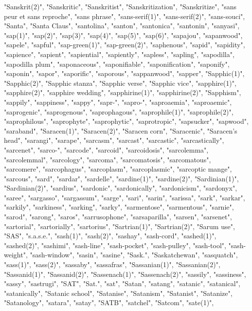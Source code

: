 "Sanskrit(2)",
"Sanskritic",
"Sanskritist",
"Sanskritization",
"Sanskritize",
"sans peur et sans reproche",
"sans phrase",
"sans-serif(1)",
"sans-serif(2)",
"sans-souci",
"Santa",
"Santa Claus",
"santolina",
"santon",
"santonica",
"santonin",
"sanyasi",
"sap(1)",
"sap(2)",
"sap(3)",
"sap(4)",
"sap(5)",
"sap(6)",
"sapajou",
"sapanwood",
"sapele",
"sapful",
"sap-green(1)",
"sap-green(2)",
"saphenous",
"sapid",
"sapidity",
"sapience",
"sapient",
"sapiential",
"sapiently",
"sapless",
"sapling",
"sapodilla",
"sapodilla plum",
"saponaceous",
"saponifiable",
"saponification",
"saponify",
"saponin",
"sapor",
"saporific",
"saporous",
"sappanwood",
"sapper",
"Sapphic(1)",
"Sapphic(2)",
"Sapphic stanza",
"Sapphic verse",
"Sapphic vice",
"sapphire(1)",
"sapphire(2)",
"sapphire wedding",
"sapphirine(1)",
"sapphirine(2)",
"Sapphism",
"sappily",
"sappiness",
"sappy",
"sapr-",
"sapro-",
"saproaemia",
"saproaemic",
"saprogenic",
"saprogenous",
"saprophagous",
"saprophile(1)",
"saprophile(2)",
"saprophilous",
"saprophyte",
"saprophytic",
"saprotropic",
"sapsucker",
"sapwood",
"saraband",
"Saracen(1)",
"Saracen(2)",
"Saracen corn",
"Saracenic",
"Saracen's head",
"sarangi",
"sarape",
"sarcasm",
"sarcast",
"sarcastic",
"sarcastically",
"sarcenet",
"sarco-",
"sarcode",
"sarcoid",
"sarcoidosis",
"sarcolemma",
"sarcolemmal",
"sarcology",
"sarcoma",
"sarcomatosis",
"sarcomatous",
"sarcomere",
"sarcophagus",
"sarcoplasm",
"sarcoplasmic",
"sarcoptic mange",
"sarcous",
"sard",
"sardar",
"sardelle",
"sardine(1)",
"sardine(2)",
"Sardinian(1)",
"Sardinian(2)",
"sardius",
"sardonic",
"sardonically",
"sardonicism",
"sardonyx",
"saree",
"sargasso",
"sargassum",
"sarge",
"sari",
"sarin",
"sarissa",
"sark",
"sarkar",
"sarkily",
"sarkiness",
"sarking",
"sarky",
"sarmentose",
"sarmentous",
"sarnie",
"sarod",
"sarong",
"saros",
"sarrusophone",
"sarsaparilla",
"sarsen",
"sarsenet",
"sartorial",
"sartorially",
"sartorius",
"Sartrian(1)",
"Sartrian(2)",
"Sarum use",
"SAS",
"s.a.s.e.",
"sash(1)",
"sash(2)",
"sashay",
"sash-cord",
"sashed(1)",
"sashed(2)",
"sashimi",
"sash-line",
"sash-pocket",
"sash-pulley",
"sash-tool",
"sash-weight",
"sash-window",
"sasin",
"sasine",
"Sask.",
"Saskatchewan",
"sasquatch",
"sass(1)",
"sass(2)",
"sassaby",
"sassafras",
"Sassanian(1)",
"Sassanian(2)",
"Sassanid(1)",
"Sassanid(2)",
"Sassenach(1)",
"Sassenach(2)",
"sassily",
"sassiness",
"sassy",
"sastrugi",
"SAT",
"Sat.",
"sat",
"Satan",
"satang",
"satanic",
"satanical",
"satanically",
"Satanic school",
"Satanise",
"Satanism",
"Satanist",
"Satanize",
"Satanology",
"satara",
"satay",
"SATB",
"satchel",
"Satcom",
"sate(1)",
